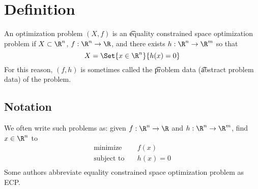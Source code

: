 
\section*{Definition}

An optimization problem $(X, f)$ is an \t{equality constrained space optimization problem} if $X \subset \R ^n$, $f: \R ^n \to \R $, and there exists $h: \R ^n \to \R ^m$ so that
\[
X = \Set{x \in \R ^n}{h(x) = 0}
\]
For this reason, $(f, h)$ is sometimes called the \t{problem data} (\t{abstract problem data}) of the problem.

\subsection*{Notation}

We often write such problems as: given $f: \R ^n \to \R $ and $h: \R ^n \to \R ^m$, find $x \in \R ^n$ to
\[
\begin{aligned}
\text{minimize} & \quad f(x) \\
\text{subject to} & \quad h(x) = 0 \\
\end{aligned}
\]
Some authors abbreviate equality constrained space optimization problem as ECP.

\blankpage